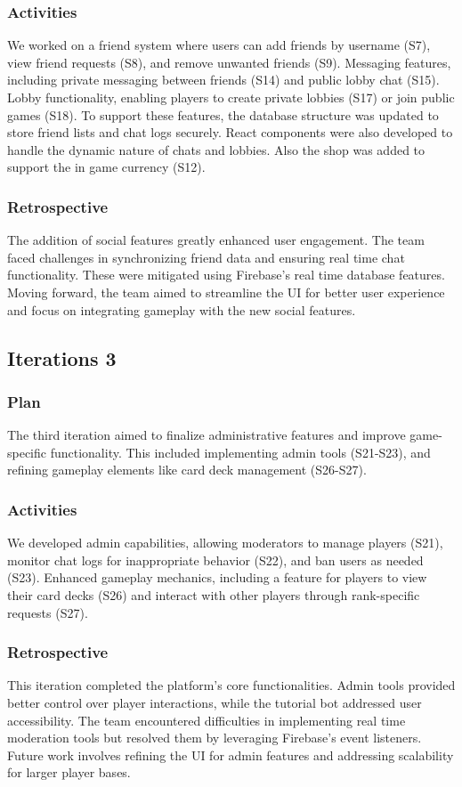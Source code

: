 \subsubsection{Activities}
We worked on a friend system where users can add friends by username (S7), view friend requests (S8), and remove unwanted friends (S9).
Messaging features, including private messaging between friends (S14) and public lobby chat (S15). Lobby functionality, enabling players to create private lobbies (S17) or join public games (S18). To support these features, the database structure was updated to store friend lists and chat logs securely. React components were also developed to handle the dynamic nature of chats and lobbies. Also the shop was added to support the in game currency (S12).

\subsubsection{Retrospective}
The addition of social features greatly enhanced user engagement. The team faced challenges in synchronizing friend data and ensuring real time chat functionality. These were mitigated using Firebase’s real time database features. Moving forward, the team aimed to streamline the UI for better user experience and focus on integrating gameplay with the new social features.

\subsection{Iterations 3}

\subsubsection{Plan}
The third iteration aimed to finalize administrative features and improve game-specific functionality. This included implementing admin tools (S21-S23), and refining gameplay elements like card deck management (S26-S27).

\subsubsection{Activities}
We developed admin capabilities, allowing moderators to manage players (S21), monitor chat logs for inappropriate behavior (S22), and ban users as needed (S23). Enhanced gameplay mechanics, including a feature for players to view their card decks (S26) and interact with other players through rank-specific requests (S27). 
\subsubsection{Retrospective}
This iteration completed the platform’s core functionalities. Admin tools provided better control over player interactions, while the tutorial bot addressed user accessibility. The team encountered difficulties in implementing real time moderation tools but resolved them by leveraging Firebase’s event listeners. Future work involves refining the UI for admin features and addressing scalability for larger player bases.


